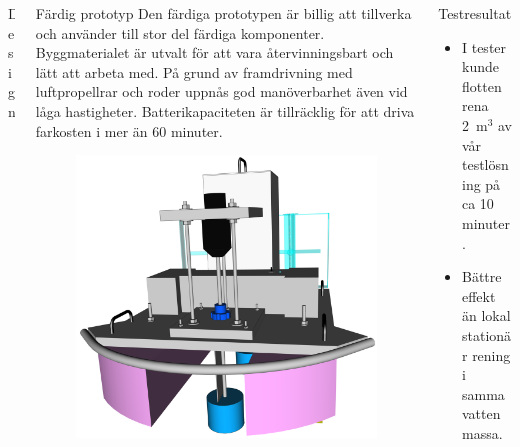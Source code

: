 \documentclass[final]{beamer}
\newlength{\onecolwid}
\begin{document}
\begin{frame}[t]
\begin{columns}[t, totalwidth=0.99\textwidth]
\begin{column}{\onecolwid}
\begin{block}{Design}
      \end{block}

    \end{column}
    \begin{column}{\onecolwid}

      \begin{block}{Färdig prototyp}
        Den färdiga prototypen är billig att tillverka och använder till stor del
        färdiga komponenter. Byggmaterialet är utvalt för att vara återvinningsbart
        och lätt att arbeta med.
        På grund av framdrivning med luftpropellrar och roder uppnås god manöverbarhet
        även vid låga hastigheter.
        Batterikapaciteten är tillräcklig för att driva farkosten i mer än 60 minuter.

        \vskip 2cm
        \begin{figure}[H]
          \centering
          \hbox{\hspace{-3cm}\includegraphics[width=25cm]{figures/front_rbr.png}}
        \end{figure}
      \end{block}

    \end{column}
    \begin{column}{\onecolwid}

      \begin{block}{Testresultat}
        \begin{itemize}
        \item I tester kunde flotten rena 2~m$^3$ av vår testlösning på ca 10 minuter.
        \item Bättre effekt än lokal stationär rening i samma vattenmassa.
        \end{itemize}


\end{block}
\end{column}
\end{columns}
\end{frame}
\end{document}
